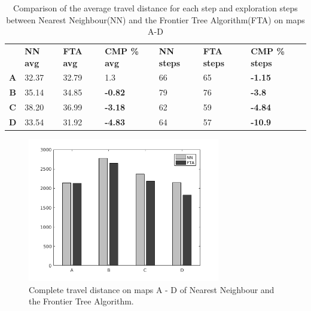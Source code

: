 \documentclass[twocolumn]{svjour3}[2016]
\begin{document}
\begin{table}[]
\centering
\def\arraystretch{1.5}
\begin{tabularx} {0.48\textwidth}{c|Y|Y|Y|Y|Y|Y}
       & \textbf{NN avg} & \textbf{FTA avg} & \textbf{CMP \% avg} & \textbf{NN steps} &\textbf{FTA steps} & \textbf{CMP \% steps} \\ \hhline{=|=|=|=|=|=|=}
\textbf{A}	&   32.37 & 32.79  & 1.3 & 66 & 65& \textbf{-1.15}\\ \hline
\textbf{B}    &    35.14& 34.85 &\textbf{-0.82} & 79& 76& \textbf{-3.8} \\ \hline
\textbf{C}    &    38.20& 36.99 &\textbf{-3.18}& 62& 59& \textbf{-4.84} \\ \hline
\textbf{D}	&	33.54&	31.92&\textbf{-4.83}& 64& 57& \textbf{-10.9} \\
\end{tabularx}
\caption{Comparison of the average travel distance for each step and exploration steps between Nearest Neighbour(NN) and the Frontier Tree Algorithm(FTA) on maps A-D }
\label{result_table_steps}
\end{table}

\begin{figure}
  \includegraphics[width=84mm]{figures/graph.png}
  \caption{
  Complete travel distance on maps A - D of Nearest Neighbour and the Frontier Tree Algorithm.}
  \label{fig:5}       %
\end{figure}
\end{document}
